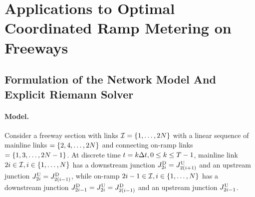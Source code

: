 \section{Applications to Optimal Coordinated Ramp Metering on Freeways\label{sec:Applications-to-Optimal}}


\subsection{Formulation of the Network Model And Explicit Riemann Solver\label{sub:Formulation-of-the}}


\paragraph{Model.}

Consider a freeway section with links $\mathcal{I}=\left\{ 1,\ldots,2N\right\}$
with a linear sequence of mainline links $=\left\{ 2,4,\ldots,2N\right\}$
and connecting on-ramp links $=\left\{ 1,3,\ldots,2N-1\right\}$. At discrete
time $t=k\Delta t,0\le k\le T-1$, mainline link $2i\in\mathcal{I},i\in\left\{ 1,\ldots,N\right\}$
has a downstream junction $J_{2i}^{\text{D}}=J_{2\left(i+1\right)}^{\text{U}}$
and an upstream junction $J_{2i}^{\text{U}}=J_{2\left(i-1\right)}^{\text{D}}$,
while on-ramp $2i-1\in\mathcal{I},i\in\left\{ 1,\ldots,N\right\}$ has a downstream
junction $J_{2i-1}^{\text{D}}=J_{2i}^{\text{U}}=J_{2\left(i-1\right)}^{\text{D}}$
and an upstream junction $J_{2i-1}^{\text{U}}$.

